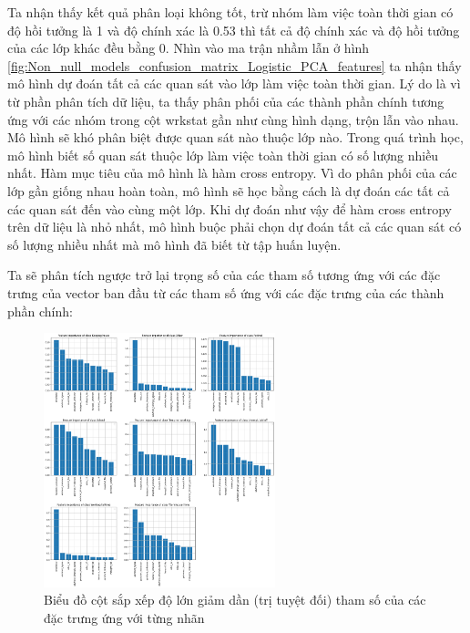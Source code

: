 \begin{enumerate}[label=(\alph*)]
    Ta nhận thấy kết quả phân loại không tốt, trừ nhóm làm việc toàn thời gian có độ hồi tưởng là 1 và độ chính xác là 0.53 thì tất cả độ chính xác và độ hồi tưởng của các lớp khác đều bằng 0.
    Nhìn vào ma trận nhầm lẫn ở hình \ref{fig:Non_null_models_confusion_matrix_Logistic_PCA_features} ta nhận thấy mô hình dự đoán tất cả các quan sát vào lớp làm việc toàn thời gian.
    Lý do là vì từ phần phân tích dữ liệu, ta thấy phân phối của các thành phần chính tương ứng với các nhóm trong cột wrkstat gần như cùng hình dạng, trộn lẫn vào nhau.
    Mô hình sẽ khó phân biệt được quan sát nào thuộc lớp nào.
    Trong quá trình học, mô hình biết số quan sát thuộc lớp làm việc toàn thời gian có số lượng nhiều nhất.
    Hàm mục tiêu của mô hình là hàm cross entropy.
    Vì do phân phối của các lớp gần giống nhau hoàn toàn, mô hình sẽ học bằng cách là dự đoán các tất cả các quan sát đến vào cùng một lớp.
    Khi dự đoán như vậy để hàm cross entropy trên dữ liệu là nhỏ nhất, mô hình buộc phải chọn dự đoán tất cả các quan sát có số lượng nhiều nhất mà mô hình đã biết từ tập huấn luyện.

    Ta sẽ phân tích ngược trở lại trọng số của các tham số tương ứng với các đặc trưng của vector ban đầu từ các tham số ứng với các đặc trưng của các thành phần chính:

    \begin{figure}[H]
        \centering
        \includegraphics[width=0.6\textwidth]{figures/Thanh/Models/Logistic/Non_null_models_Feature_Importance_Logistic_PCA_features.png}
        \caption{Biểu đồ cột sắp xếp độ lớn giảm dần (trị tuyệt đối) tham số của các đặc trưng ứng với từng nhãn}
        \label{fig:Non_null_models_Feature_Importance_Logistic_PCA_features}
    \end{figure}


\end{enumerate}
